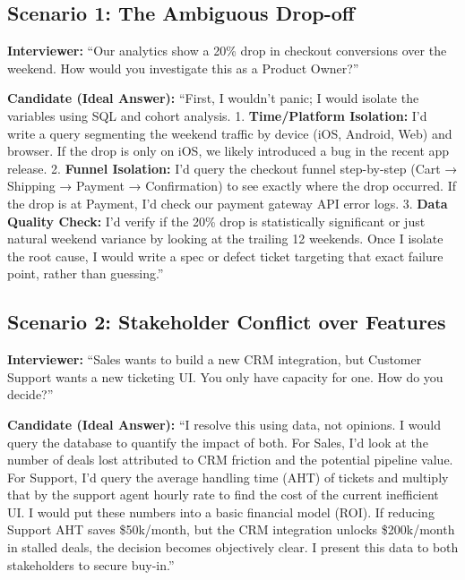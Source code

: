 \subsection{Scenario 1: The Ambiguous
Drop-off}\label{scenario-1-the-ambiguous-drop-off}

\textbf{Interviewer:} ``Our analytics show a 20\% drop in checkout
conversions over the weekend. How would you investigate this as a
Product Owner?''

\textbf{Candidate (Ideal Answer):} ``First, I wouldn't panic; I would
isolate the variables using SQL and cohort analysis. 1.
\textbf{Time/Platform Isolation:} I'd write a query segmenting the
weekend traffic by device (iOS, Android, Web) and browser. If the drop
is only on iOS, we likely introduced a bug in the recent app release. 2.
\textbf{Funnel Isolation:} I'd query the checkout funnel step-by-step
(Cart → Shipping → Payment → Confirmation) to see exactly where the drop
occurred. If the drop is at Payment, I'd check our payment gateway API
error logs. 3. \textbf{Data Quality Check:} I'd verify if the 20\% drop
is statistically significant or just natural weekend variance by looking
at the trailing 12 weekends. Once I isolate the root cause, I would
write a spec or defect ticket targeting that exact failure point, rather
than guessing.''

\subsection{Scenario 2: Stakeholder Conflict over
Features}\label{scenario-2-stakeholder-conflict-over-features}

\textbf{Interviewer:} ``Sales wants to build a new CRM integration, but
Customer Support wants a new ticketing UI. You only have capacity for
one. How do you decide?''

\textbf{Candidate (Ideal Answer):} ``I resolve this using data, not
opinions. I would query the database to quantify the impact of both. For
Sales, I'd look at the number of deals lost attributed to CRM friction
and the potential pipeline value. For Support, I'd query the average
handling time (AHT) of tickets and multiply that by the support agent
hourly rate to find the cost of the current inefficient UI. I would put
these numbers into a basic financial model (ROI). If reducing Support
AHT saves \$50k/month, but the CRM integration unlocks \$200k/month in
stalled deals, the decision becomes objectively clear. I present this
data to both stakeholders to secure buy-in.''

